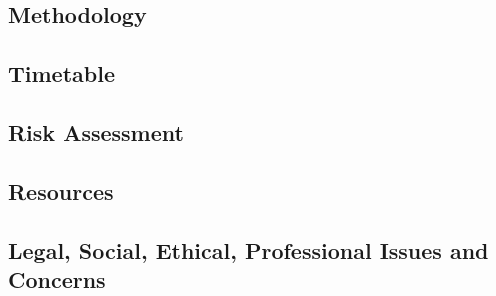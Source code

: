 \subsection{Methodology}
\subsection{Timetable}
\subsection{Risk Assessment}
\subsection{Resources}
\subsection{Legal, Social, Ethical, Professional Issues and Concerns}